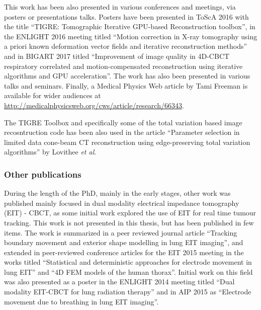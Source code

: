 This work has been also presented in various conferences and meetings, via posters or presentations talks. Posters have been presented in ToScA 2016 with the title ``TIGRE: Tomographic Iterative GPU-based Reconstruction toolbox''\cite{biguri_ander_2016_159016}, in the ENLIGHT 2016 meeting titled ``Motion correction in X-ray tomography using a priori known deformation vector fields and iterative reconstruction methods''\cite{biguri2016motion} and in BIGART 2017 titled ``Improvement of image quality in 4D-CBCT respiratory correlated and motion-compensated reconstruction using iterative algorithms and GPU acceleration''\cite{biguri2017motion}. The work has also been presented in various talks and seminars. Finally, a Medical Physics Web article by Tami Freeman is available for wider audiences at \href{http://medicalphysicsweb.org/cws/article/research/66343}{http://medicalphysicsweb.org/cws/article/research/66343}.

The TIGRE Toolbox and specifically some of the total variation based image recosntruction code has been also used in the article ``Parameter selection in limited data cone-beam CT reconstruction using edge-preserving total variation algorithms'' by Lovithee \textit{et al}\cite{Vee}.

\subsubsection{Other publications}

During the length of the PhD, mainly in the early stages, other work was published mainly focused in dual modality electrical impedance tomography (EIT) - CBCT, as some initial work explored the use of EIT for real time tumour tracking. This work is not presented in this thesis, but has been published in few items. The work is summarized in a peer reviewed journal article ``Tracking boundary movement and exterior shape modelling in lung EIT imaging''\cite{biguri2015tracking}, and extended in peer-reviewed conference articles for the EIT 2015 meeting in the works titled ``Statistical and deterministic approaches for electrode movement in lung EIT''\cite{biguri2015statistical} and ``4D FEM models of the human thorax''\cite{biguri20154d}. Initial work on this field was also presented as a poster in the ENLIGHT 2014 meeting titled ``Dual modality EIT-CBCT for lung radiation therapy''\cite{biguri2015dual} and in AIP 2015 as ``Electrode movement due to breathing in lung EIT imaging''\cite{biguri2015electrode}.






